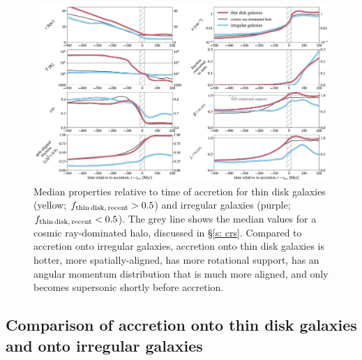 \documentclass[fleqn,usenatbib]{mnras}
\newcommand{\fthin}{f_{\rm thin\,disk,\,recent}}
\begin{document}
\begin{figure}
    \centering
    \includegraphics[width=\textwidth]{figures/variations/relative_to_accretion/before_and_after/before_and_after_combined2.pdf}
    \caption{
    Median properties relative to time of accretion for thin disk galaxies (yellow; $\fthin>0.5$) and irregular galaxies (purple; $\fthin<0.5$).
    The grey line shows the median values for a cosmic ray-dominated halo, discussed in \S\ref{s: crs}.
    Compared to accretion onto irregular galaxies, accretion onto thin disk galaxies is hotter, more spatially-aligned, has more rotational support, has an angular momentum distribution that is much more aligned, and only becomes supersonic shortly before accretion.
    }
    \label{f: before and after combined}
\end{figure}

\subsection{Comparison of accretion onto thin disk galaxies and onto irregular galaxies}
\end{document}
